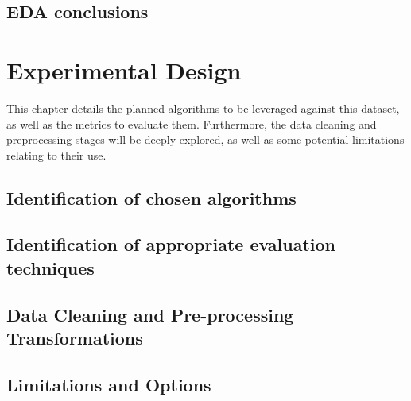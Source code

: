 \documentclass[12pt]{report}
\begin{document}
\section{EDA conclusions}


\chapter{Experimental Design} %
This chapter details the planned algorithms to be leveraged against this dataset,
as well as the metrics to evaluate them. Furthermore, the data cleaning and preprocessing 
stages will be deeply explored, as well as some potential limitations relating to their use.

\section{Identification of chosen algorithms}


\section{Identification of appropriate evaluation techniques}

\section{Data Cleaning and Pre-processing Transformations}

\section{Limitations and Options}
\end{document}
